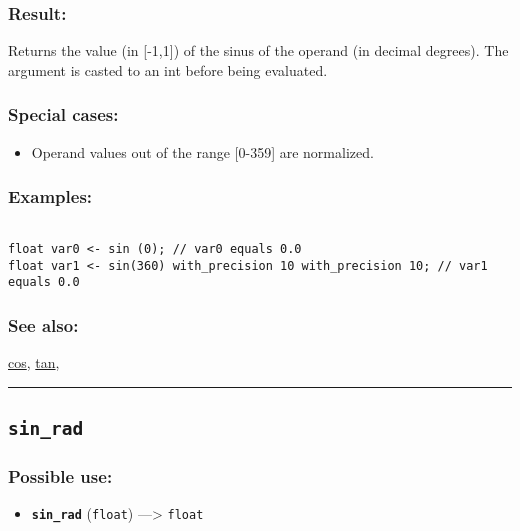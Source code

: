 \documentclass[]{book}
\providecommand{\tightlist}{%
  \setlength{\itemsep}{0pt}\setlength{\parskip}{0pt}}
\theoremstyle{definition}
\theoremstyle{definition}
\theoremstyle{definition}
\theoremstyle{remark}
\begin{document}
\subsubsection{Result:}\label{result-460}

Returns the value (in {[}-1,1{]}) of the sinus of the operand (in
decimal degrees). The argument is casted to an int before being
evaluated.

\subsubsection{Special cases:}\label{special-cases-122}

\begin{itemize}
\tightlist
\item
  Operand values out of the range {[}0-359{]} are normalized.
\end{itemize}

\subsubsection{Examples:}\label{examples-332}

\begin{verbatim}
 
float var0 <- sin (0); // var0 equals 0.0 
float var1 <- sin(360) with_precision 10 with_precision 10; // var1 equals 0.0
\end{verbatim}

\subsubsection{See also:}\label{see-also-185}

\href{OperatorsBC\#cos}{cos}, \href{OperatorsSZ\#tan}{tan},

\begin{center}\rule{0.5\linewidth}{\linethickness}\end{center}

\subsection{\texorpdfstring{\texttt{sin\_rad}}{sin\_rad}}\label{sin_rad}

\subsubsection{Possible use:}\label{possible-use-477}

\begin{itemize}
\tightlist
\item
  \textbf{\texttt{sin\_rad}} (\texttt{float}) ---\textgreater{}
  \texttt{float}
\end{itemize}
\end{document}

